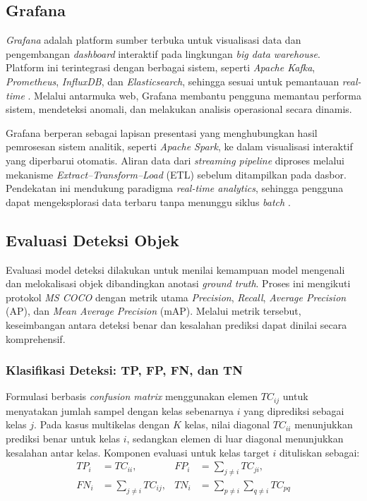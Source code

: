 \subsection{Grafana}

\textit{Grafana} adalah platform sumber terbuka untuk visualisasi data dan
pengembangan \textit{dashboard} interaktif pada lingkungan
\textit{big data warehouse}. Platform ini terintegrasi dengan berbagai sistem,
seperti \textit{Apache Kafka}, \textit{Prometheus}, \textit{InfluxDB}, dan
\textit{Elasticsearch}, sehingga sesuai untuk pemantauan \textit{real-time}
\cite{sutanto2025wazuhgrafana}. Melalui antarmuka web, Grafana membantu pengguna
memantau performa sistem, mendeteksi anomali, dan melakukan analisis
operasional secara dinamis.

Grafana berperan sebagai lapisan presentasi yang menghubungkan hasil
pemrosesan sistem analitik, seperti \textit{Apache Spark}, ke dalam
visualisasi interaktif yang diperbarui otomatis. Aliran data dari
\textit{streaming pipeline} diproses melalui mekanisme
\textit{Extract--Transform--Load} (ETL) sebelum ditampilkan pada dasbor.
Pendekatan ini mendukung paradigma \textit{real-time analytics}, sehingga
pengguna dapat mengeksplorasi data terbaru tanpa menunggu siklus
\textit{batch} \cite{devireddy2020realtimewarehouse}.

\subsection{Evaluasi Deteksi Objek}

Evaluasi model deteksi dilakukan untuk menilai kemampuan model mengenali dan
melokalisasi objek dibandingkan anotasi \textit{ground truth}. Proses ini
mengikuti protokol \textit{MS COCO} \cite{lin2014microsoft} dengan metrik
utama \textit{Precision}, \textit{Recall}, \textit{Average Precision} (AP),
dan \textit{Mean Average Precision} (mAP). Melalui metrik tersebut,
keseimbangan antara deteksi benar dan kesalahan prediksi dapat dinilai secara
komprehensif.

\subsubsection{Klasifikasi Deteksi: TP, FP, FN, dan TN}

Formulasi berbasis \textit{confusion matrix} menggunakan elemen $TC_{ij}$
untuk menyatakan jumlah sampel dengan kelas sebenarnya $i$ yang diprediksi
sebagai kelas $j$. Pada kasus multikelas dengan $K$ kelas, nilai diagonal
$TC_{ii}$ menunjukkan prediksi benar untuk kelas $i$, sedangkan elemen di luar
diagonal menunjukkan kesalahan antar kelas. Komponen evaluasi untuk kelas
target $i$ dituliskan sebagai:
\begin{equation}
\begin{aligned}
TP_i &= TC_{ii}, & FP_i &= \sum_{j \neq i} TC_{ji}, \\
FN_i &= \sum_{j \neq i} TC_{ij}, & TN_i &= \sum_{p \neq i} \sum_{q \neq i} TC_{pq}
\end{aligned}
\end{equation}

